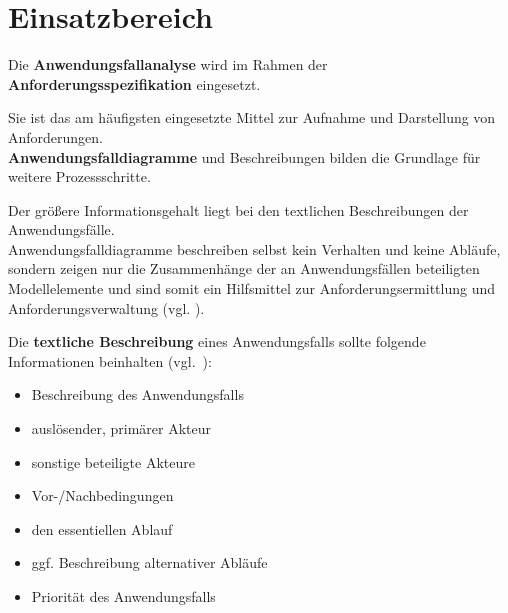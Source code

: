 \section{Einsatzbereich}

\begin{tcolorbox}
    Die \textbf{Anwendungsfallanalyse} wird im Rahmen der \textbf{Anforderungsspezifikation} eingesetzt.
\end{tcolorbox}

\noindent
Sie ist das am häufigsten eingesetzte Mittel zur Aufnahme und Darstellung von Anforderungen.\\

\noindent
\textbf{Anwendungsfalldiagramme} und Beschreibungen bilden die Grundlage für weitere Prozessschritte.

\vspace{2mm}
\begin{tcolorbox}
Der größere Informationsgehalt liegt bei den textlichen Beschreibungen der Anwendungsfälle.\\

\noindent
Anwendungsfalldiagramme beschreiben selbst kein Verhalten und keine Abläufe, sondern zeigen nur die Zusammenhänge der an Anwendungsfällen beteiligten Modellelemente und sind somit ein Hilfsmittel zur Anforderungsermittlung und Anforderungsverwaltung (vgl. \cite[213]{Oes05}).
\end{tcolorbox}
\vspace{2mm}

\noindent
Die \textbf{textliche Beschreibung} eines Anwendungsfalls sollte folgende Informationen beinhalten (vgl.~\cite[51]{Buh09}):

\begin{itemize}
    \item Beschreibung des Anwendungsfalls
    \item auslösender, primärer Akteur
    \item sonstige beteiligte Akteure
    \item Vor-/Nachbedingungen
    \item den essentiellen Ablauf
    \item ggf. Beschreibung alternativer Abläufe
    \item Priorität des Anwendungsfalls
\end{itemize}

